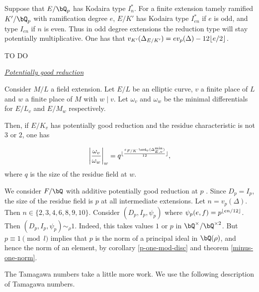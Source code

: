 Suppose that $E / \bQ_p$ has Kodaira type $I_n^*$. For a finite extension tamely ramified $K' / \bQ_p$ with ramification degree $e$, $E / K'$ has Kodaira type $I_{en}^*$ if $e$ is odd, and type $I_{en}$ if $n$ is even. Thus in odd degree extensions the reduction type will stay potentially multiplicative.
One has that $v_{K'}(\Delta_{E / K'}) = e v_p(\Delta) - 12\lfloor e / 2\rfloor$.



{\color{red} TO DO}
\vspace{10em}


\noindent\underline{\textit{Potentially good reduction}}

\begin{lemma}
    Consider $M / L$ a field extension. Let $E / L$ be an elliptic curve, $v$ a finite place of $L$ and $w$ a finite place of $M$ with $w \mid v$. Let $\omega_v$ and $\omega_w$ be the minimal differentials for $E / L_v$ and $E / M_w$ respectively. 
    
    Then, if $E / K_v$ has potentially good reduction and the residue characteristic is not $3$ or $2$, one has
    
    \[ \left|\frac{\omega_v}{\omega_w} \right|_{w} = q^{\floor{\frac{e_{F / K} \cdot \ord_v(\Delta_{E, v}^{\min})}{12}}}, \]
    where $q$ is the size of the residue field at $w$.
\end{lemma}

We consider $F / \bQ$ with additive potentially good reduction at $p$ . Since $D_p = I_p$, the size of the residue field is $p$ at all intermediate extensions. Let $n = v_p(\Delta)$. Then $n \in \{2,3,4,6,8,9,10\}$.  Consider $(D_p, I_p, \psi_p)$ where $\psi_p(e,f) = p^{\lfloor e n / 12\rfloor}$. Then $(D_p, I_p, \psi_p) \sim_{\rho} 1$. Indeed, this takes values $1$ or $p$ in $\bQ^{\times} / \bQ^{\times 2}$. But $p \equiv 1 \pmod l$ implies that $p$ is the norm of a principal ideal in $\bQ(\rho)$, and hence the norm of an element, by corollary \ref{p-one-mod-disc} and theorem \ref{minus-one-norm}.

The Tamagawa numbers take a little more work. We use the following description of Tamagawa numbers. %

